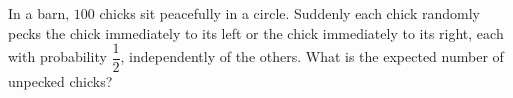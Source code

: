 In a barn, $100$ chicks sit peacefully in a circle. Suddenly each chick randomly pecks the chick immediately to its left or the chick immediately to its right, each with probability $\dfrac{1}{2}$, independently of the others. What is the expected number of unpecked chicks?
